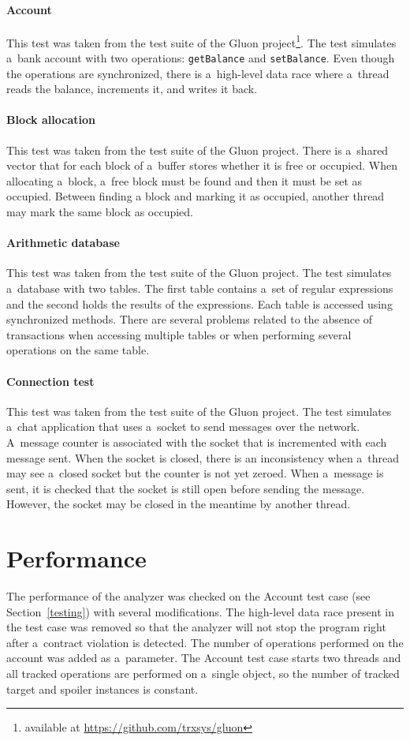 \paragraph{Account}
This test was taken from the test suite of the Gluon project\footnote{available
at \url{https://github.com/trxsys/gluon}}. The test simulates a~bank account
with two operations: \texttt{getBalance} and \texttt{setBalance}. Even though
the operations are synchronized, there is a~high-level data race where a~thread
reads the balance, increments it, and writes it back.

\paragraph{Block allocation}
This test was taken from the test suite of the Gluon project. There is a~shared
vector that for each block of a~buffer stores whether it is free or occupied.
When allocating a~block, a~free block must be found and then it must be set as
occupied. Between finding a block and marking it as occupied, another thread may
mark the same block as occupied.

\paragraph{Arithmetic database}
This test was taken from the test suite of the Gluon project. The test simulates
a~database with two tables. The first table contains a~set of regular
expressions and the second holds the results of the expressions. Each table is
accessed using synchronized methods. There are several problems related to the
absence of transactions when accessing multiple tables or when performing
several operations on the same table.

\paragraph{Connection test}
This test was taken from the test suite of the Gluon project. The test simulates
a~chat application that uses a~socket to send messages over the network.
A~message counter is associated with the socket that is incremented with each
message sent. When the socket is closed, there is an inconsistency when a~thread
may see a~closed socket but the counter is not yet zeroed. When a~message is
sent, it is checked that the socket is still open before sending the message.
However, the socket may be closed in the meantime by another thread.


\section{Performance}
The performance of the analyzer was checked on the Account test case (see
Section~\ref{testing}) with several modifications. The high-level data race
present in the test case was removed so that the analyzer will not stop the
program right after a~contract violation is detected. The number of operations
performed on the account was added as a~parameter. The Account test case starts
two threads and all tracked operations are performed on a~single object, so the
number of tracked target and spoiler instances is constant.


